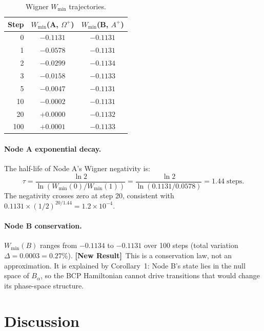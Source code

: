 \documentclass[12pt]{article}
\newcommand{\newresult}{\textbf{[New Result]}}
\begin{document}
\begin{table}[H]\centering
\caption{Wigner $W_{\min}$ trajectories.}
\label{tab:wigner}
\begin{tabular}{rcc}
\toprule
\textbf{Step} & $W_{\min}$(A, $\Omega^+$) & $W_{\min}$(B, $A^+$)\\\midrule
0   & $-0.1131$ & $-0.1131$\\
1   & $-0.0578$ & $-0.1131$\\
2   & $-0.0299$ & $-0.1134$\\
3   & $-0.0158$ & $-0.1133$\\
5   & $-0.0047$ & $-0.1131$\\
10  & $-0.0002$ & $-0.1131$\\
20  & $+0.0000$ & $-0.1132$\\
100 & $+0.0001$ & $-0.1133$\\
\bottomrule
\end{tabular}
\end{table}

\paragraph{Node A exponential decay.}
The half-life of Node A's Wigner negativity is:
\begin{equation}
\tau = \frac{\ln 2}{\ln(W_{\min}(0)/W_{\min}(1))} =
\frac{\ln 2}{\ln(0.1131/0.0578)} = 1.44\;\text{steps}.
\end{equation}
The negativity crosses zero at step 20, consistent with
$0.1131\times(1/2)^{20/1.44} = 1.2\times10^{-4}$.

\paragraph{Node B conservation.}
$W_{\min}(B)$ ranges from $-0.1134$ to $-0.1131$ over 100 steps
(total variation $\Delta = 0.0003 = 0.27\%$).  \newresult\ This is a
conservation law, not an approximation.  It is explained by
Corollary~1: Node B's state lies in the null space of $B_\alpha$, so the
BCP Hamiltonian cannot drive transitions that would change its
phase-space structure.

\section{Discussion}
\label{sec:discussion}
\end{document}
